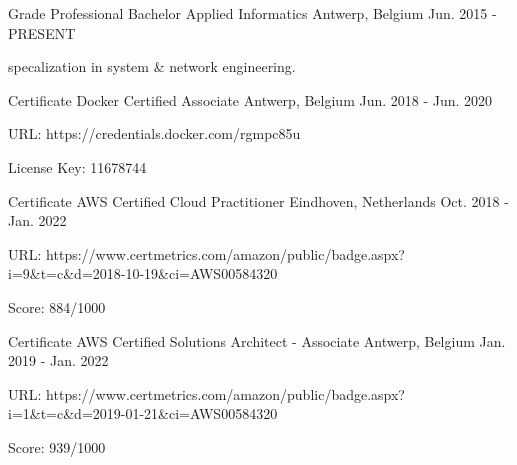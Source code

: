 

\begin{cventries}

  \cventry
    {Grade} %
    {Professional Bachelor Applied Informatics} %
    {Antwerp, Belgium} %
    {Jun. 2015 - PRESENT} %
    {
      \begin{cvitems} %
        \item {specalization in system \& network engineering.}
      \end{cvitems}
    }

  \cventry
    {Certificate} %
    {Docker Certified Associate} %
    {Antwerp, Belgium} %
    {Jun. 2018 - Jun. 2020} %
    {
      \begin{cvitems} %
        \item {URL: https://credentials.docker.com/rgmpc85u}
        \item {License Key: 11678744}
      \end{cvitems}
    }

  \cventry
    {Certificate} %
    {AWS Certified Cloud Practitioner} %
    {Eindhoven, Netherlands} %
    {Oct. 2018 - Jan. 2022} %
    {
      \begin{cvitems} %
        \item {URL: https://www.certmetrics.com/amazon/public/badge.aspx?i=9\&t=c\&d=2018-10-19\&ci=AWS00584320}
        \item {Score: 884/1000}
      \end{cvitems}
    }

  \cventry
    {Certificate} %
    {AWS Certified Solutions Architect - Associate } %
    {Antwerp, Belgium} %
    {Jan. 2019 - Jan. 2022} %
    {
      \begin{cvitems} %
        \item {URL: https://www.certmetrics.com/amazon/public/badge.aspx?i=1\&t=c\&d=2019-01-21\&ci=AWS00584320}
        \item {Score: 939/1000}
      \end{cvitems}
    }

\end{cventries}
